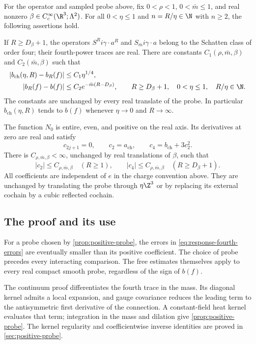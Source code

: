 \documentclass[11pt,letterpaper,reqno]{amsart}
\begin{document}
\begin{theorem}\label{prop:response-fourth}
For the operator and sampled probe above, fix
$0<\rho<1$, $0<\bar m\le1$, and real nonzero
$\beta\in C_c^\infty(\R^3;\Lambda^2)$.
For all $0<\eta\le1$ and $n=R/\eta\in\N$ with $n\ge2$,
the following assertions hold.

If $R\ge D_\beta+1$, the operators $S^Ri\gamma\cdot a^R$ and
$S_{\bar m}i\gamma\cdot a$ belong to the Schatten class
of order four; their fourth-power traces are real.
There are constants
$C_1(\rho,\bar m,\beta)$ and $C_2(\bar m,\beta)$ such that
\begin{align}\label{eq:response-fourth-errors}
 |b_{\mathrm{ch}}(\eta,R)-b_R(f)|&\le C_1\eta^{1/4},\notag\\
 |b_R(f)-b(f)|&\le C_2e^{-\bar m(R-D_\beta)},
 \qquad R\ge D_\beta+1,\quad0<\eta\le1,\quad R/\eta\in\N.
\end{align}
The constants are unchanged by every real translate of
the probe. In particular $b_{\mathrm{ch}}(\eta,R)$ tends
to $b(f)$ whenever $\eta\to0$ and $R\to\infty$.

The function $N_0$ is entire, even, and positive on the real axis.
Its derivatives at zero are real and satisfy
\[
 c_{2j+1}=0,\qquad c_2=a_{\mathrm{ch}},\qquad
 c_4=b_{\mathrm{ch}}+3c_2^2 .
\]
There is $C_{\rho,\bar m,\beta}<\infty$, unchanged by real
translations of $\beta$, such that
\[
 |c_2|\le C_{\rho,\bar m,\beta}\quad(R\ge1),\qquad
 |c_4|\le C_{\rho,\bar m,\beta}\quad(R\ge D_\beta+1).
\]
All coefficients are independent of $e$ in the charge convention
above. They are unchanged by translating the probe through
$\eta\Z^3$ or by replacing its external cochain by a cubic reflected
cochain.
\end{theorem}


\subsection{The proof and its use}

For a probe chosen by \cref{prop:positive-probe}, the errors in
\eqref{eq:response-fourth-errors} are eventually smaller than its
positive coefficient. The choice of probe precedes every
interacting comparison. The free estimates themselves apply to
every real compact smooth probe, regardless of the sign of $b(f)$.

The continuum proof differentiates the fourth trace in the mass.
Its diagonal kernel admits a local expansion, and gauge covariance
reduces the leading term to the antisymmetric first derivative of
the connection. A constant-field heat kernel evaluates that term;
integration in the mass and dilation give \cref{prop:positive-probe}.
The kernel regularity and coefficientwise inverse identities are
proved in \cref{sec:positive-probe}.
\end{document}
